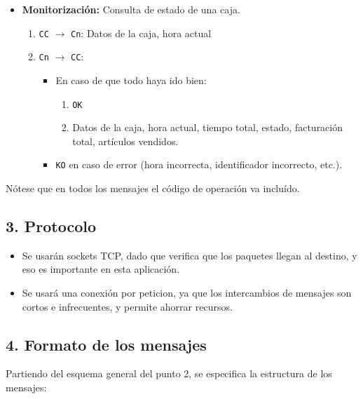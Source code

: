 \begin{itemize}
    \item \textbf{Monitorización:} Consulta de estado de una caja.
    \begin{enumerate}
        \item \texttt{CC} $\rightarrow$ \texttt{Cn}: Datos de la caja, hora actual
        \item \texttt{Cn} $\rightarrow$ \texttt{CC}: 
        \begin{itemize}
            \item En caso de que todo haya ido bien:
            \begin{enumerate}
                \item \texttt{OK}
                \item Datos de la caja, hora actual, tiempo total, estado, facturación total, artículos vendidos.
            \end{enumerate}
            \item \texttt{KO} en caso de error (hora incorrecta, identificador incorrecto, etc.).
        \end{itemize}
    \end{enumerate}
\end{itemize}

Nótese que en todos los mensajes el código de operación va incluído.

\subsection*{3. Protocolo}
\begin{itemize}
    \item Se usarán sockets TCP, dado que verifica que los paquetes llegan al destino, y eso es importante en esta aplicación.
    \item Se usará una conexión por peticion, ya que los intercambios de mensajes son cortos e infrecuentes, y permite ahorrar recursos.
\end{itemize}



\subsection*{4. Formato de los mensajes}

Partiendo del esquema general del punto 2, se especifica la estructura de los mensajes:

